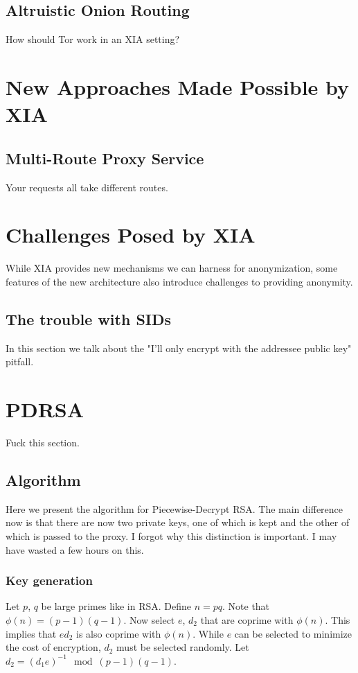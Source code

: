\documentclass{article}
\begin{document}
\subsection{Altruistic Onion Routing}
How should Tor work in an XIA setting?

\section{New Approaches Made Possible by XIA}
\subsection{Multi-Route Proxy Service}
Your requests all take different routes.

\section{Challenges Posed by XIA}
While XIA provides new mechanisms we can harness for anonymization, some features of the new architecture also introduce challenges to providing anonymity.
\subsection{The trouble with SIDs}
In this section we talk about the "I'll only encrypt with the addressee public key" pitfall.

\section{PDRSA}
Fuck this section.
\subsection{Algorithm}
Here we present the algorithm for Piecewise-Decrypt RSA.  The main difference now is that there are now two private keys, one of which is kept and the other of which is passed  to the proxy.  I forgot why this distinction is important.  I may have wasted a few hours on this.
\subsubsection{Key generation}
Let $p$, $q$ be large primes like in RSA. Define $n = pq$. Note that $\phi(n) = (p-1)(q-1)$. Now select $e$, $d_2$ that are coprime with $\phi(n)$.  This implies that $ed_2$ is also coprime with $\phi(n)$.  While $e$ can be selected to minimize the cost of encryption, $d_2$ must be selected randomly.  Let $d_2 = (d_1e)^{-1} \mod(p-1)(q-1)$.  
\end{document}
